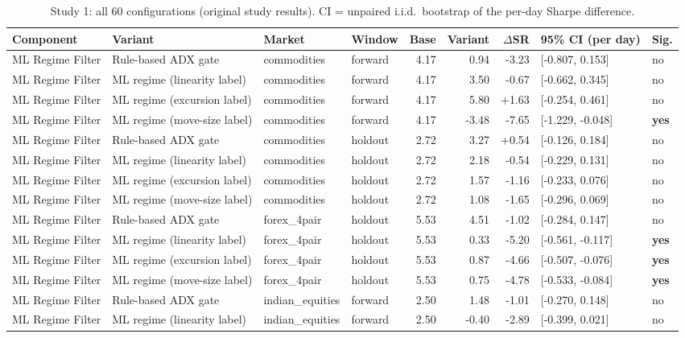\begin{longtable}{l l l l r r r l l}
\caption{Study 1: all 60 configurations (original study results). CI = unpaired i.i.d.\ bootstrap of the per-day Sharpe difference.} \label{tab:s1} \\
\toprule
Component & Variant & Market & Window & Base & Variant & $\Delta$SR & 95\% CI (per day) & Sig. \\
\midrule
\endhead
\bottomrule
\endfoot
ML Regime Filter & Rule-based ADX gate & commodities & forward & 4.17 & 0.94 & -3.23 & [-0.807, 0.153] & no \\
ML Regime Filter & ML regime (linearity label) & commodities & forward & 4.17 & 3.50 & -0.67 & [-0.662, 0.345] & no \\
ML Regime Filter & ML regime (excursion label) & commodities & forward & 4.17 & 5.80 & +1.63 & [-0.254, 0.461] & no \\
ML Regime Filter & ML regime (move-size label) & commodities & forward & 4.17 & -3.48 & -7.65 & [-1.229, -0.048] & \textbf{yes} \\
ML Regime Filter & Rule-based ADX gate & commodities & holdout & 2.72 & 3.27 & +0.54 & [-0.126, 0.184] & no \\
ML Regime Filter & ML regime (linearity label) & commodities & holdout & 2.72 & 2.18 & -0.54 & [-0.229, 0.131] & no \\
ML Regime Filter & ML regime (excursion label) & commodities & holdout & 2.72 & 1.57 & -1.16 & [-0.233, 0.076] & no \\
ML Regime Filter & ML regime (move-size label) & commodities & holdout & 2.72 & 1.08 & -1.65 & [-0.296, 0.069] & no \\
ML Regime Filter & Rule-based ADX gate & forex\_4pair & holdout & 5.53 & 4.51 & -1.02 & [-0.284, 0.147] & no \\
ML Regime Filter & ML regime (linearity label) & forex\_4pair & holdout & 5.53 & 0.33 & -5.20 & [-0.561, -0.117] & \textbf{yes} \\
ML Regime Filter & ML regime (excursion label) & forex\_4pair & holdout & 5.53 & 0.87 & -4.66 & [-0.507, -0.076] & \textbf{yes} \\
ML Regime Filter & ML regime (move-size label) & forex\_4pair & holdout & 5.53 & 0.75 & -4.78 & [-0.533, -0.084] & \textbf{yes} \\
ML Regime Filter & Rule-based ADX gate & indian\_equities & forward & 2.50 & 1.48 & -1.01 & [-0.270, 0.148] & no \\
ML Regime Filter & ML regime (linearity label) & indian\_equities & forward & 2.50 & -0.40 & -2.89 & [-0.399, 0.021] & no \\

\end{longtable}
